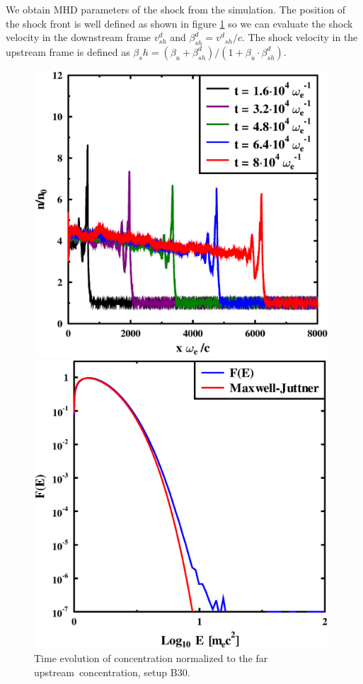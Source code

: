 \documentclass[a4paper]{jpconf}
\begin{document}
We obtain MHD parameters of the shock from the simulation. The position of the shock front is well defined as shown in figure \ref{density_noturb} so we can evaluate the shock velocity in the downstream frame $v^d_{sh}$  and $\beta^d_{sh} = {v^d}_{sh}/c$. The shock velocity in the upstream frame is defined as $\beta_sh = (\beta_u + \beta^d_{sh})/(1 + \beta_u \cdot\beta^d_{sh})$.
	\begin{figure}[h!]
		\centering
		\begin{minipage}{0.49\textwidth}
			\centering
			\includegraphics[width=0.98\textwidth]{concentrations.eps} 
			\caption{Time evolution of concentration normalized to the far upstream~concentration, setup B30.}
			\label{density_noturb}
		\end{minipage}\hfill
		\begin{minipage}{0.49\textwidth}
			\centering
			\includegraphics[width=0.98\textwidth]{electrons2.eps} 

\end{minipage}
\end{figure}
\end{document}
